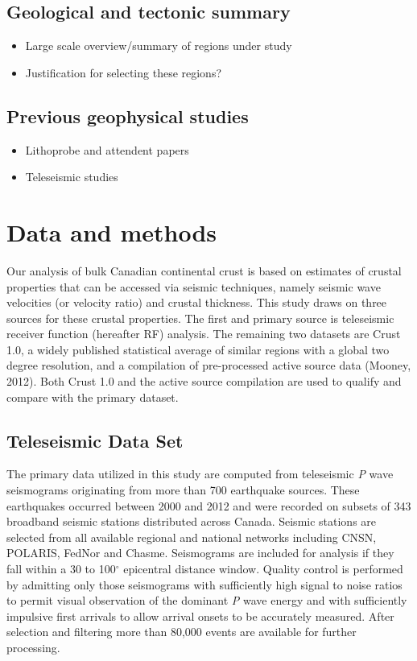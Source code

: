 \documentclass[draft, 12pt]{article}
\begin{document}
\subsection{Geological and tectonic summary}
\begin{itemize}

\item Large scale overview/summary of regions under study
\item Justification for selecting these regions?

\end{itemize}

\subsection{Previous geophysical studies}
\begin{itemize}

\item Lithoprobe and attendent papers
\item Teleseismic studies

\end{itemize}
\section{Data and methods}
Our analysis of bulk Canadian continental crust is based on estimates of crustal properties that can be accessed via seismic techniques, namely seismic wave velocities (or velocity ratio) and crustal thickness. This study draws on three sources for these crustal properties. The first and primary source is teleseismic receiver function (hereafter RF) analysis. The remaining two datasets are Crust 1.0, a widely published statistical average of similar regions with a global two degree resolution, and a compilation of pre-processed active source data (Mooney, 2012). Both Crust 1.0 and the active source compilation are used to qualify and compare with the primary dataset.

\subsection{Teleseismic Data Set}
The primary data utilized in this study are computed from teleseismic {\it P} wave seismograms originating from more than 700 earthquake sources. These earthquakes occurred between 2000 and 2012 and were recorded on subsets of 343 broadband seismic stations distributed across Canada. Seismic stations are selected from all available regional and national networks including CNSN, POLARIS, FedNor and Chasme. Seismograms are included for analysis if they fall within a 30 to 100$^\circ$ epicentral distance window. Quality control is performed by admitting only those seismograms with sufficiently high signal to noise ratios to permit visual observation of the dominant {\it P} wave energy and with sufficiently impulsive first arrivals to allow arrival onsets to be accurately measured. After selection and filtering more than 80,000 events are available for further processing.
\end{document}
